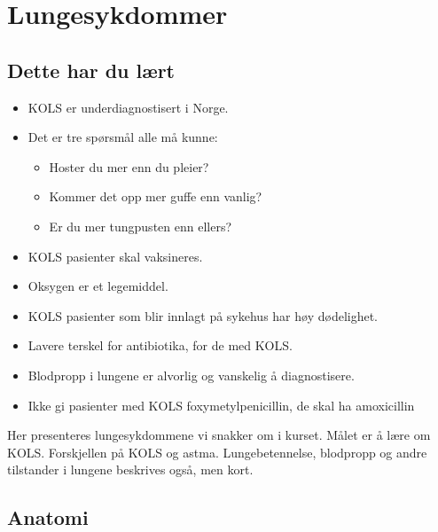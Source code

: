 \chapter{Lungesykdommer}
		\section{Dette har du lært}
			\begin{itemize}
				\item KOLS er underdiagnostisert i Norge.\\
				\item Det er tre spørsmål alle må kunne\cite{anthonisen}:\\
					\begin{itemize}
						\item Hoster du mer enn du pleier?\\
						\item Kommer det opp mer guffe enn vanlig?\\
						\item Er du mer tungpusten enn ellers?\\
					\end{itemize}
				\item KOLS pasienter skal vaksineres.\\
				\item Oksygen er et legemiddel.\\
				\item KOLS pasienter som blir innlagt på sykehus har høy dødelighet.\\
				\item Lavere terskel for antibiotika, for de med KOLS.\\
				\item Blodpropp i lungene er alvorlig og vanskelig å diagnostisere.\\
				\item Ikke gi pasienter med KOLS foxymetylpenicillin, de skal ha amoxicillin\\
			\end{itemize}Her presenteres lungesykdommene vi snakker om i kurset. Målet er å lære om KOLS. Forskjellen på KOLS og astma. Lungebetennelse, blodpropp og andre tilstander i lungene beskrives også, men kort.
		\section{Anatomi}
